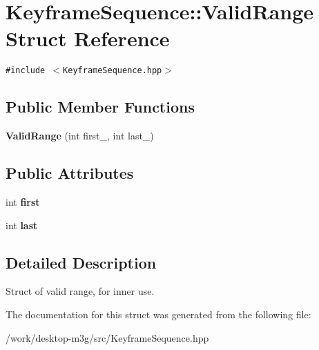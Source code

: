 \hypertarget{structm3g_1_1KeyframeSequence_1_1ValidRange}{
\section{KeyframeSequence::ValidRange Struct Reference}
\label{structm3g_1_1KeyframeSequence_1_1ValidRange}
}
{\tt \#include $<$KeyframeSequence.hpp$>$}

\subsection*{Public Member Functions}
\begin{CompactItemize}
\item 
\hypertarget{structm3g_1_1KeyframeSequence_1_1ValidRange_d9ada86c9bba00101977e5f3f456b9ce}{
\textbf{ValidRange} (int first\_\-, int last\_\-)}
\label{structm3g_1_1KeyframeSequence_1_1ValidRange_d9ada86c9bba00101977e5f3f456b9ce}

\end{CompactItemize}
\subsection*{Public Attributes}
\begin{CompactItemize}
\item 
\hypertarget{structm3g_1_1KeyframeSequence_1_1ValidRange_6c8ec3c3e77241328358d43697f6f840}{
int \textbf{first}}
\label{structm3g_1_1KeyframeSequence_1_1ValidRange_6c8ec3c3e77241328358d43697f6f840}

\item 
\hypertarget{structm3g_1_1KeyframeSequence_1_1ValidRange_72e27dee31b1c4c6a504fbed29542d97}{
int \textbf{last}}
\label{structm3g_1_1KeyframeSequence_1_1ValidRange_72e27dee31b1c4c6a504fbed29542d97}

\end{CompactItemize}


\subsection{Detailed Description}
Struct of valid range, for inner use. 

The documentation for this struct was generated from the following file:\begin{CompactItemize}
\item 
/work/desktop-m3g/src/KeyframeSequence.hpp\end{CompactItemize}
